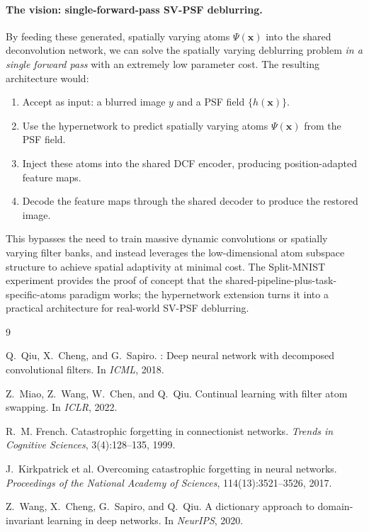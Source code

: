 \documentclass[11pt,letterpaper]{article}
\begin{document}
\paragraph{The vision: single-forward-pass SV-PSF deblurring.}
By feeding these generated, spatially varying atoms
$\Psi(\mathbf{x})$ into the shared deconvolution network, we can solve the
spatially varying deblurring problem \emph{in a single forward pass} with
an extremely low parameter cost.  The resulting architecture would:
\begin{enumerate}[leftmargin=*]
  \item Accept as input: a blurred image $y$ and a PSF field
        $\{h(\mathbf{x})\}$.
  \item Use the hypernetwork to predict spatially varying atoms
        $\Psi(\mathbf{x})$ from the PSF field.
  \item Inject these atoms into the shared DCF encoder, producing
        position-adapted feature maps.
  \item Decode the feature maps through the shared decoder to produce
        the restored image.
\end{enumerate}
This bypasses the need to train massive dynamic convolutions or
spatially varying filter banks, and instead leverages the low-dimensional
atom subspace structure to achieve spatial adaptivity at minimal cost.
The Split-MNIST experiment provides the proof of concept that the
shared-pipeline-plus-task-specific-atoms paradigm works; the hypernetwork
extension turns it into a practical architecture for real-world SV-PSF
deblurring.


\begin{thebibliography}{9}

Q.~Qiu, X.~Cheng, and G.~Sapiro.
: Deep neural network with decomposed convolutional filters.
\newblock In \emph{ICML}, 2018.

Z.~Miao, Z.~Wang, W.~Chen, and Q.~Qiu.
\newblock Continual learning with filter atom swapping.
\newblock In \emph{ICLR}, 2022.

R.~M. French.
\newblock Catastrophic forgetting in connectionist networks.
\newblock \emph{Trends in Cognitive Sciences}, 3(4):128--135, 1999.

J.~Kirkpatrick et al.
\newblock Overcoming catastrophic forgetting in neural networks.
\newblock \emph{Proceedings of the National Academy of Sciences},
  114(13):3521--3526, 2017.

Z.~Wang, X.~Cheng, G.~Sapiro, and Q.~Qiu.
\newblock A dictionary approach to domain-invariant learning in deep networks.
\newblock In \emph{NeurIPS}, 2020.

\end{thebibliography}
\end{document}
